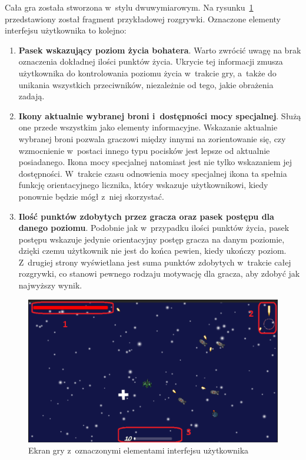 Cała gra została stworzona w~stylu dwuwymiarowym. Na rysunku~\ref{fig:ui} przedstawiony został fragment przykładowej rozgrywki. Oznaczone elementy interfejsu użytkownika to kolejno:
\begin{enumerate}
	\item \textbf{Pasek wskazujący poziom życia bohatera}. Warto zwrócić uwagę na brak oznaczenia dokładnej ilości punktów życia. Ukrycie tej informacji zmusza użytkownika do kontrolowania poziomu życia w~trakcie gry, a~także do unikania wszystkich przeciwników, niezależnie od tego, jakie obrażenia zadają.
	\item \textbf{Ikony aktualnie wybranej broni i~dostępności mocy specjalnej}. Służą one przede wszystkim jako elementy informacyjne. Wskazanie aktualnie wybranej broni pozwala graczowi między innymi na zorientowanie się, czy wzmocnienie w~postaci innego typu pocisków jest lepsze od aktualnie posiadanego. Ikona mocy specjalnej natomiast jest nie tylko wskazaniem jej dostępności. W~trakcie czasu odnowienia mocy specjalnej ikona ta spełnia funkcję orientacyjnego licznika, który wskazuje użytkownikowi, kiedy ponownie będzie mógł z~niej skorzystać.
	\item \textbf{Ilość punktów zdobytych przez gracza oraz pasek postępu dla danego poziomu}. Podobnie jak w~przypadku ilości punktów życia, pasek postępu wskazuje jedynie orientacyjny postęp gracza na danym poziomie, dzięki czemu użytkownik nie jest do końca pewien, kiedy ukończy poziom. Z~drugiej strony wyświetlana jest suma punktów zdobytych w~trakcie całej rozgrywki, co stanowi pewnego rodzaju motywację dla gracza, aby zdobyć jak najwyższy wynik.
\end{enumerate}

\begin{figure}
	\centering
	\includegraphics[width=0.7\linewidth]{images/ui.png}
	\caption{Ekran gry z~oznaczonymi elementami interfejsu użytkownika}
	\label{fig:ui}
\end{figure}

